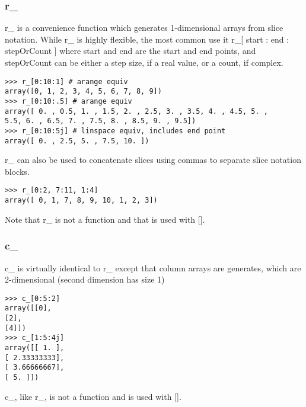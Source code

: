 \documentclass[KSmain.tex]{subfiles}
\begin{document}
\subsubsection{r\_}
r\_ is a convenience function which generates 1-dimensional arrays from slice notation. While r\_ is highly
flexible, the most common use it r\_[ start : end : stepOrCount ] where start and end are the start and end
points, and stepOrCount can be either a step size, if a real value, or a count, if complex.
\begin{framed}
\begin{verbatim}
>>> r_[0:10:1] # arange equiv
array([0, 1, 2, 3, 4, 5, 6, 7, 8, 9])
>>> r_[0:10:.5] # arange equiv
array([ 0. , 0.5, 1. , 1.5, 2. , 2.5, 3. , 3.5, 4. , 4.5, 5. ,
5.5, 6. , 6.5, 7. , 7.5, 8. , 8.5, 9. , 9.5])
>>> r_[0:10:5j] # linspace equiv, includes end point
array([ 0. , 2.5, 5. , 7.5, 10. ])
\end{verbatim}
\end{framed}
r\_ can also be used to concatenate slices using commas to separate slice notation blocks.
\begin{framed}
\begin{verbatim}
>>> r_[0:2, 7:11, 1:4]
array([ 0, 1, 7, 8, 9, 10, 1, 2, 3])
\end{verbatim}
\end{framed}
Note that r\_ is not a function and that is used with [].
\subsubsection{c\_}
c\_ is virtually identical to r\_ except that column arrays are generates, which are 2-dimensional (second
dimension has size 1)
\begin{framed}
\begin{verbatim}
>>> c_[0:5:2]
array([[0],
[2],
[4]])
>>> c_[1:5:4j]
array([[ 1. ],
[ 2.33333333],
[ 3.66666667],
[ 5. ]])
\end{verbatim}
\end{framed}
c\_, like r\_, is not a function and is used with [].

\end{document}
